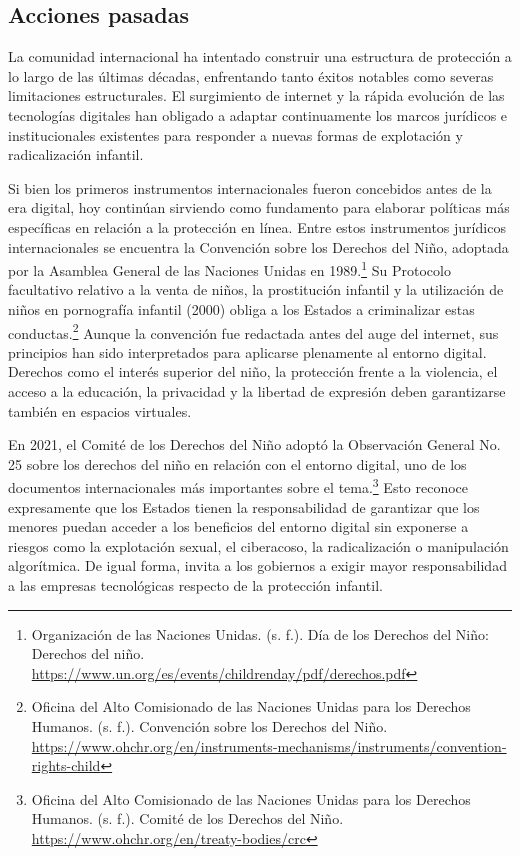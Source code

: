 \subsection{Acciones pasadas}

La comunidad internacional ha intentado construir una estructura de protección a lo largo de las últimas décadas, enfrentando tanto éxitos notables como severas limitaciones estructurales. El surgimiento de internet y la rápida evolución de las tecnologías digitales han obligado a adaptar continuamente los marcos jurídicos e institucionales existentes para responder a nuevas formas de explotación y radicalización infantil.

Si bien los primeros instrumentos internacionales fueron concebidos antes de la era digital, hoy continúan sirviendo como fundamento para elaborar políticas más específicas en relación a la protección en línea. Entre estos instrumentos jurídicos internacionales se encuentra la Convención sobre los Derechos del Niño, adoptada por la Asamblea General de las Naciones Unidas en 1989.\footnote{Organización de las Naciones Unidas. (s. f.). Día de los Derechos del Niño: Derechos del niño. \url{https://www.un.org/es/events/childrenday/pdf/derechos.pdf}} Su Protocolo facultativo relativo a la venta de niños, la prostitución infantil y la utilización de niños en pornografía infantil (2000) obliga a los Estados a criminalizar estas conductas.\footnote{Oficina del Alto Comisionado de las Naciones Unidas para los Derechos Humanos. (s. f.). Convención sobre los Derechos del Niño. \url{https://www.ohchr.org/en/instruments-mechanisms/instruments/convention-rights-child}} Aunque la convención fue redactada antes del auge del internet, sus principios han sido interpretados para aplicarse plenamente al entorno digital. Derechos como el interés superior del niño, la protección frente a la violencia, el acceso a la educación, la privacidad y la libertad de expresión deben garantizarse también en espacios virtuales.

En 2021, el Comité de los Derechos del Niño adoptó la Observación General No. 25 sobre los derechos del niño en relación con el entorno digital, uno de los documentos internacionales más importantes sobre el tema.\footnote{Oficina del Alto Comisionado de las Naciones Unidas para los Derechos Humanos. (s. f.). Comité de los Derechos del Niño. \url{https://www.ohchr.org/en/treaty-bodies/crc}} Esto reconoce expresamente que los Estados tienen la responsabilidad de garantizar que los menores puedan acceder a los beneficios del entorno digital sin exponerse a riesgos como la explotación sexual, el ciberacoso, la radicalización o manipulación algorítmica. De igual forma, invita a los gobiernos a exigir mayor responsabilidad a las empresas tecnológicas respecto de la protección infantil.

